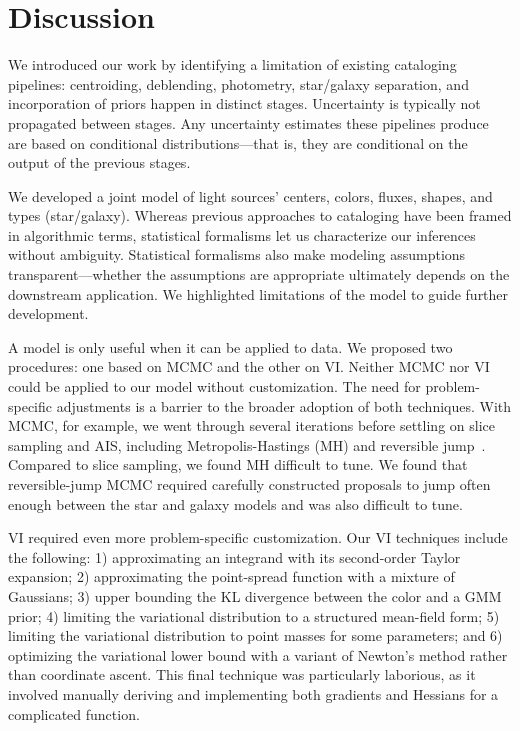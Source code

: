 \section{Discussion}
\label{sec:discussion}

We introduced our work by identifying a limitation of existing cataloging pipelines: centroiding, deblending, photometry, star/galaxy separation, and incorporation of priors happen in distinct stages.
Uncertainty is typically not propagated between stages.
Any uncertainty estimates these pipelines produce are based on conditional distributions---that is, they are conditional on the output of the previous stages.

We developed a joint model of light sources' centers, colors, fluxes, shapes, and types (star/galaxy).
Whereas previous approaches to cataloging have been framed in algorithmic terms,
statistical formalisms let us characterize our inferences without ambiguity.
Statistical formalisms also make modeling assumptions transparent---whether the assumptions are appropriate ultimately depends on the downstream application.
We highlighted limitations of the model to guide further development.

A model is only useful when it can be applied to data.
We proposed two procedures: one based on MCMC and the other on VI.
Neither MCMC nor VI could be applied to our model without customization.
The need for problem-specific adjustments is a barrier to the broader adoption of both techniques.
With MCMC, for example, we went through several iterations before settling on slice sampling and AIS, including Metropolis-Hastings (MH) and reversible jump~\citep{green1995reversible}.
Compared to slice sampling, we found MH difficult to tune.
We found that reversible-jump MCMC required carefully constructed proposals to jump often enough between the star and galaxy models and was also difficult to tune.

VI required even more problem-specific customization.
Our VI techniques include the following: 1) approximating an integrand with its second-order Taylor expansion; 2) approximating the point-spread function with a mixture of Gaussians; 3) upper bounding the KL divergence between the color and a GMM prior; 4) limiting the variational distribution to a structured mean-field form; 5) limiting the variational distribution to point masses for some parameters; and 6) optimizing the variational lower bound with a variant of Newton's method rather than coordinate ascent. This final technique was particularly laborious, as it involved manually deriving and implementing both gradients and Hessians for a complicated function.

